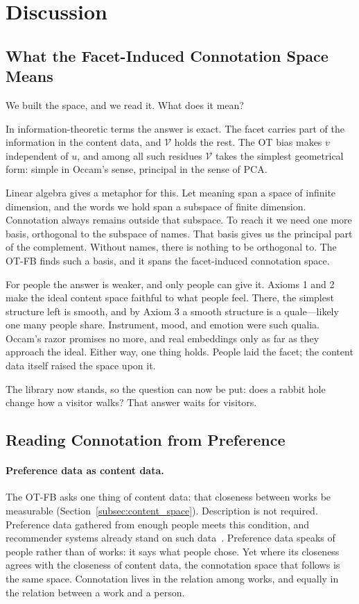 \section{Discussion}\label{sec:discussion}

\subsection{What the Facet-Induced Connotation Space
    Means}\label{subsec:what_it_means}
We built the space, and we read it. What does it mean?

In information-theoretic terms the answer is exact. The facet carries part
of the information in the content data, and $\mathcal{V}$ holds the rest.
The OT bias makes $v$ independent of $u$, and among all such residues
$\mathcal{V}$ takes the simplest geometrical form: simple in Occam's sense,
principal in the sense of PCA.

Linear algebra gives a metaphor for this. Let meaning span a space of
infinite dimension, and the words we hold span a subspace of finite
dimension. Connotation always remains outside that subspace. To reach it we
need one more basis, orthogonal to the subspace of names. That basis gives
us the principal part of the complement. Without names, there is nothing to
be orthogonal to. The OT-FB finds such a basis, and it spans the
facet-induced connotation space.

For people the answer is weaker, and only people can give it. Axioms 1 and 2
make the ideal content space faithful to what people feel. There, the simplest
structure left is smooth, and by Axiom 3 a smooth structure is a
quale---likely one many people share. Instrument, mood, and emotion were such
qualia. Occam's razor promises no more, and real embeddings only as far as
they approach the ideal. Either way, one thing holds. People laid the facet;
the content data itself raised the space upon it.

The library now stands, so the question can now be put: does a rabbit hole
change how a visitor walks? That answer waits for visitors.



\subsection{Reading Connotation from
    Preference}\label{subsec:reading_preference}

\paragraph{Preference data as content data.}
The OT-FB asks one thing of content data: that closeness between works be
measurable (Section~\ref{subsec:content_space}). Description is not required.
Preference data gathered from enough people meets this condition, and
recommender systems already stand on such data~\citep{Koren200930}. Preference
data speaks of people rather than of works: it says what people chose. Yet where
its closeness agrees with the closeness of content data, the connotation space
that follows is the same space. Connotation lives in the relation among works,
and equally in the relation between a work and a person.

